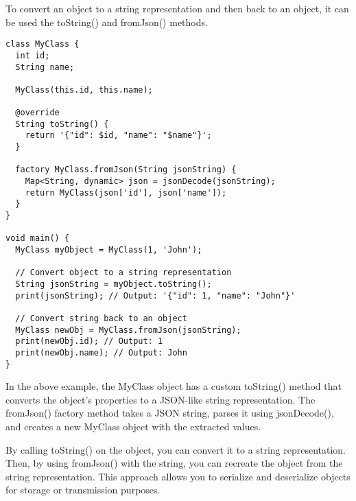 To convert an object to a string representation and then back to an object, it can be used the toString() 
and fromJson() methods. 

\begin{lstlisting}
class MyClass {
  int id;
  String name;

  MyClass(this.id, this.name);

  @override
  String toString() {
    return '{"id": $id, "name": "$name"}';
  }

  factory MyClass.fromJson(String jsonString) {
    Map<String, dynamic> json = jsonDecode(jsonString);
    return MyClass(json['id'], json['name']);
  }
}

void main() {
  MyClass myObject = MyClass(1, 'John');
  
  // Convert object to a string representation
  String jsonString = myObject.toString();
  print(jsonString); // Output: '{"id": 1, "name": "John"}'
  
  // Convert string back to an object
  MyClass newObj = MyClass.fromJson(jsonString);
  print(newObj.id); // Output: 1
  print(newObj.name); // Output: John
}
\end{lstlisting}

In the above example, the MyClass object has a custom toString() method that converts the object's properties to a 
JSON-like string representation. The fromJson() factory method takes a JSON string, parses it using jsonDecode(), 
and creates a new MyClass object with the extracted values.

By calling toString() on the object, you can convert it to a string representation. Then, by using fromJson() with the 
string, you can recreate the object from the string representation. This approach allows you to serialize and 
deserialize objects for storage or transmission purposes.
